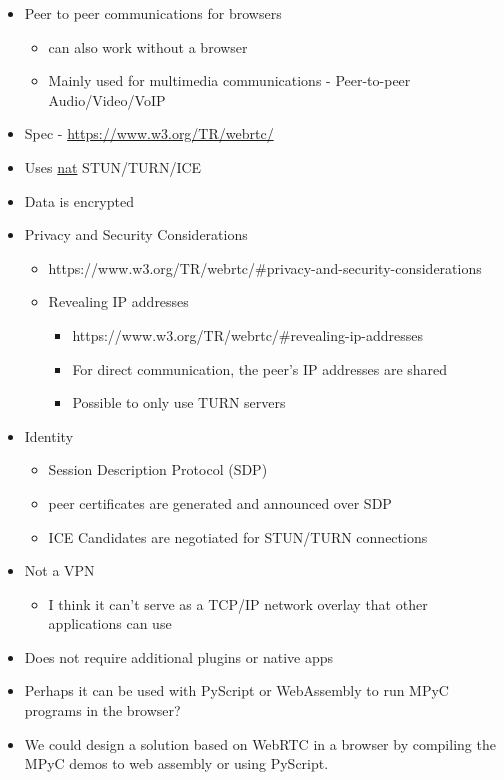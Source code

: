 \begin{itemize}
\tightlist
\item
  Peer to peer communications for browsers

  \begin{itemize}
  \tightlist
  \item
    can also work without a browser
  \item
    Mainly used for multimedia communications - Peer-to-peer
    Audio/Video/VoIP
  \end{itemize}
\item
  Spec -
  \href{https://www.w3.org/TR/webrtc/\#persistent-information-exposed-by-webrtc}{https://www.w3.org/TR/webrtc/}
\item
  Uses \href{notes/02021-internet-protocol.md}{nat} STUN/TURN/ICE
\item
  Data is encrypted
\item
  Privacy and Security Considerations

  \begin{itemize}
  \tightlist
  \item
    https://www.w3.org/TR/webrtc/\#privacy-and-security-considerations
  \item
    Revealing IP addresses

    \begin{itemize}
    \tightlist
    \item
      https://www.w3.org/TR/webrtc/\#revealing-ip-addresses
    \item
      For direct communication, the peer's IP addresses are shared
    \item
      Possible to only use TURN servers
    \end{itemize}
  \end{itemize}
\item
  Identity

  \begin{itemize}
  \tightlist
  \item
    Session Description Protocol (SDP)
  \item
    peer certificates are generated and announced over SDP
  \item
    ICE Candidates are negotiated for STUN/TURN connections
  \end{itemize}
\item
  Not a VPN

  \begin{itemize}
  \tightlist
  \item
    I think it can't serve as a TCP/IP network overlay that other
    applications can use
  \end{itemize}
\item
  Does not require additional plugins or native apps
\item
  Perhaps it can be used with PyScript or WebAssembly to run MPyC
  programs in the browser?
\item
  We could design a solution based on WebRTC in a browser by compiling
  the MPyC demos to web assembly or using PyScript.


\end{itemize}

